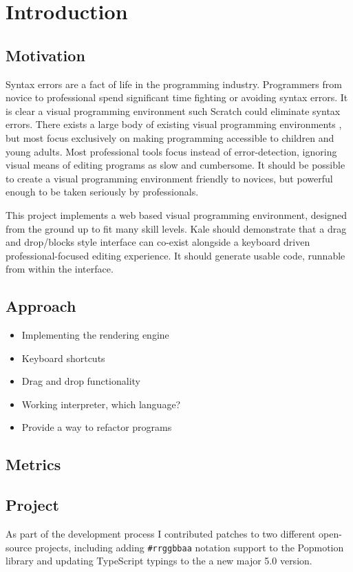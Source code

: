 \chapter{Introduction}

\section{Motivation}
Syntax errors are a fact of life in the programming industry. Programmers from
novice\cite{Denny2011} to professional spend significant time fighting or
avoiding syntax errors. It is clear a visual programming environment such
Scratch could eliminate syntax errors. There exists a large body of existing
visual programming environments \cite{Beldie1983}, but most focus exclusively
on making programming accessible to children and young adults. Most
professional tools focus instead of error-detection, ignoring visual means of
editing programs as slow and cumbersome. It should be possible to create a
visual programming environment friendly to novices, but powerful enough to be
taken seriously by professionals. 

This project implements a web based visual programming environment, designed
from the ground up to fit many skill levels. Kale should demonstrate that a
drag and drop/blocks style interface can co-exist alongside a keyboard driven
professional-focused editing experience. It should generate usable code,
runnable from within the interface.

\section{Approach}

\begin{itemize}
	\item Implementing the rendering engine
	\item Keyboard shortcuts
	\item Drag and drop functionality
	\item Working interpreter, which language?
	\item Provide a way to refactor programs
\end{itemize}

\section{Metrics}
\section{Project}

As part of the development process I contributed patches to two different
open-source projects, including adding \texttt{\#rrggbbaa} notation support
to the Popmotion library \cite{github-pr-popmotion} and updating
 TypeScript typings to the a new major 5.0
version\cite{github-pr-styled-components}.
